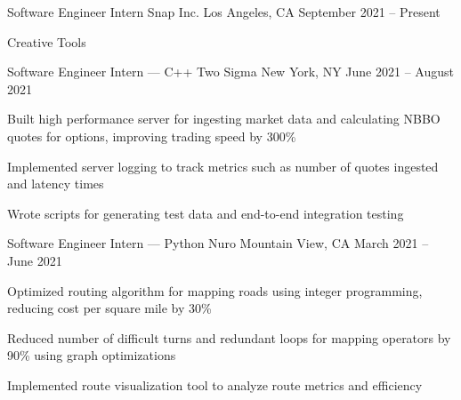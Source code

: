 \documentclass[12pt, letterpaper]{awesome-cv}
\begin{document}
\begin{cventries}
  \cventry
    {Sof\/tware Engineer Intern} %
    {Snap Inc.} %
    {Los Angeles, CA} %
    {September 2021 -- Present} %
    {
      \begin{cvitems} %
        \item {Creative Tools}
      \end{cvitems}
    }

  \cventry
    {Sof\/tware Engineer Intern — C++} %
    {Two Sigma} %
    {New York, NY} %
    {June 2021 -- August 2021} %
    {
      \begin{cvitems} %
        \item {Built high performance server for ingesting market data and calculating NBBO quotes for options, improving trading speed by 300\%}
        \item {Implemented server logging to track metrics such as number of quotes ingested and latency times}
        \item {Wrote scripts for generating test data and end-to-end integration testing}
      \end{cvitems}
    }

  \cventry
    {Sof\/tware Engineer Intern — Python} %
    {Nuro} %
    {Mountain View, CA} %
    {March 2021 -- June 2021} %
    {
      \begin{cvitems} %
      	\item {Optimized routing algorithm for mapping roads using integer programming, reducing cost per square mile by 30\%}
      	\item {Reduced number of dif\/ficult turns and redundant loops for mapping operators by 90\% using graph optimizations}
      	\item {Implemented route visualization tool to analyze route metrics and ef\/ficiency}
      \end{cvitems}
    }


\end{cventries}
\end{document}
